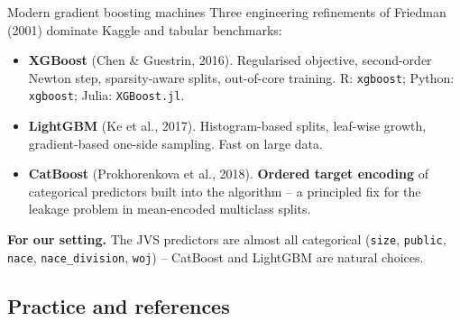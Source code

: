 \documentclass[10pt,ignorenonframetext,aspectratio=169]{beamer}
\begin{document}
\begin{frame}{Modern gradient boosting machines}
Three engineering refinements of Friedman (2001) dominate Kaggle and tabular benchmarks:
\begin{itemize}
    \justifying
    \item \textbf{XGBoost} (Chen \& Guestrin, 2016). Regularised objective, second-order Newton step, sparsity-aware splits, out-of-core training. R: \texttt{xgboost}; Python: \texttt{xgboost}; Julia: \texttt{XGBoost.jl}.
    \item \textbf{LightGBM} (Ke et al., 2017). Histogram-based splits, leaf-wise growth, gradient-based one-side sampling. Fast on large data.
    \item \textbf{CatBoost} (Prokhorenkova et al., 2018). \textbf{Ordered target encoding} of categorical predictors built into the algorithm -- a principled fix for the leakage problem in mean-encoded multiclass splits.
\end{itemize}

\medskip
\textbf{For our setting.} The JVS predictors are almost all categorical (\texttt{size}, \texttt{public}, \texttt{nace}, \texttt{nace\_division}, \texttt{woj}) -- CatBoost and LightGBM are natural choices.
\end{frame}


\subsection{Practice and references}
\end{document}
